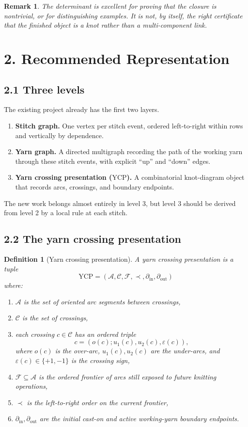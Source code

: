 \documentclass[11pt]{article}
\newtheorem{definition}{Definition}
\newtheorem{remark}{Remark}
\newcommand{\YCP}{\mathrm{YCP}}
\newcommand{\Front}{\mathcal{F}}
\newcommand{\Arcs}{\mathcal{A}}
\newcommand{\Cross}{\mathcal{C}}
\begin{document}
\begin{remark}
The determinant is excellent for proving that the closure is \emph{nontrivial}, or for distinguishing examples. It is not, by itself, the right certificate that the finished object is a knot rather than a multi-component link.
\end{remark}

\section*{2. Recommended Representation}

\subsection*{2.1 Three levels}
The existing project already has the first two layers.
\begin{enumerate}[leftmargin=1.5em,itemsep=0.2em]
    \item \textbf{Stitch graph.} One vertex per stitch event, ordered left-to-right within rows and vertically by dependence.
    \item \textbf{Yarn graph.} A directed multigraph recording the path of the working yarn through these stitch events, with explicit ``up'' and ``down'' edges.
    \item \textbf{Yarn crossing presentation (\(\YCP\)).} A combinatorial knot-diagram object that records arcs, crossings, and boundary endpoints.
\end{enumerate}

The new work belongs almost entirely in level 3, but level 3 should be derived from level 2 by a local rule at each stitch.

\subsection*{2.2 The yarn crossing presentation}
\begin{definition}[Yarn crossing presentation]
A yarn crossing presentation is a tuple
\[
\YCP=(\Arcs,\Cross,\Front,\prec,\partial_{\mathrm{in}},\partial_{\mathrm{out}})
\]
where:
\begin{enumerate}[leftmargin=1.5em,itemsep=0.2em]
    \item \(\Arcs\) is the set of oriented arc segments between crossings,
    \item \(\Cross\) is the set of crossings,
    \item each crossing \(c\in\Cross\) has an ordered triple
    \[
    c=(o(c);u_1(c),u_2(c),\varepsilon(c)),
    \]
    where \(o(c)\) is the over-arc, \(u_1(c),u_2(c)\) are the under-arcs, and \(\varepsilon(c)\in\{+1,-1\}\) is the crossing sign,
    \item \(\Front\subseteq \Arcs\) is the ordered frontier of arcs still exposed to future knitting operations,
    \item \(\prec\) is the left-to-right order on the current frontier,
    \item \(\partial_{\mathrm{in}},\partial_{\mathrm{out}}\) are the initial cast-on and active working-yarn boundary endpoints.
\end{enumerate}
\end{definition}
\end{document}

